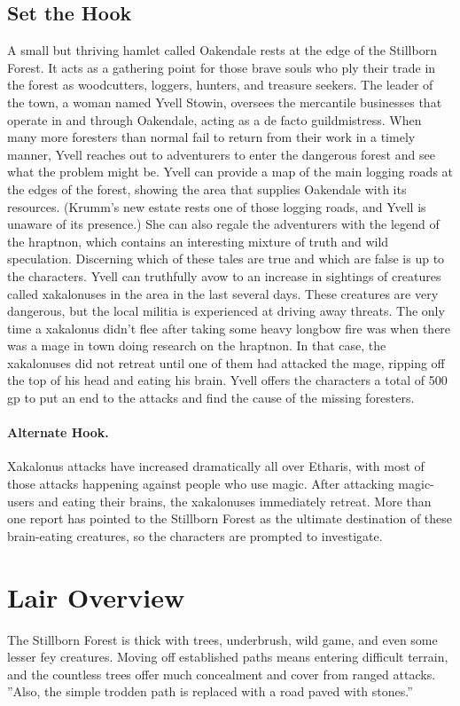 \documentclass[10pt,a4paper,twoside,twocolumn,openany,bg=print,nodeprecatedcode]{dndbook}
\begin{document}
\subsection{Set the Hook}
A small but thriving hamlet called Oakendale rests at the edge of the Stillborn Forest. It acts as a gathering point for those brave souls who ply their trade in the forest as woodcutters, loggers, hunters, and treasure seekers. The leader of the town, a woman named Yvell Stowin, oversees the mercantile businesses that operate in and through Oakendale, acting as a de facto guildmistress. When many more foresters than normal fail to return from their work in a timely manner, Yvell reaches out to adventurers to enter the dangerous forest and see what the problem might be.
Yvell can provide a map of the main logging roads at the edges of the forest, showing the area that supplies Oakendale with its resources. (Krumm's new estate rests one of those logging roads, and Yvell is unaware of its presence.) She can also regale the adventurers with the legend of the hraptnon, which contains an interesting mixture of truth and wild speculation. Discerning which of these tales are true and which are false is up to the characters.
Yvell can truthfully avow to an increase in sightings of creatures called xakalonuses in the area in the last several days. These creatures are very dangerous, but the local militia is experienced at driving away threats. The only time a xakalonus didn't flee after taking some heavy longbow fire was when there was a mage in town doing research on the hraptnon. In that case, the xakalonuses did not retreat until one of them had attacked the mage, ripping off the top of his head and eating his brain. Yvell offers the characters a total of 500 gp to put an end to the attacks and find the cause of the missing foresters.
\paragraph{Alternate Hook.}
Xakalonus attacks have increased dramatically all over Etharis, with most of those attacks happening against people who use magic. After attacking magic-users and eating their brains, the xakalonuses immediately retreat. More than one report has pointed to the Stillborn Forest as the ultimate destination of these brain-eating creatures, so the characters are prompted to investigate.
\section{Lair Overview}
The Stillborn Forest is thick with trees, underbrush, wild game, and even some lesser fey creatures. Moving off established paths means entering difficult terrain, and the countless trees offer much concealment and cover from ranged attacks.
\DndQuote%
{}
{''Also, the simple trodden path is replaced with a road paved with stones.''}
{}
\end{document}
